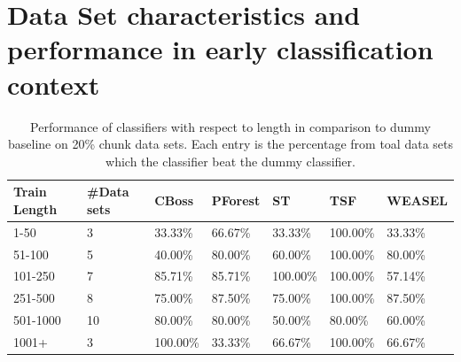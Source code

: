   \section{Data Set characteristics and performance in early classification context}
  \label{AppendixDataCharacteristis}
        \begin{table}[!ht]
            \setlength\extrarowheight{2pt} %
            \begin{tabularx}{\textwidth}{|X|X|X|X|X|X|X|}
            \hline
            \textbf{Train Length} & \textbf{\#Data sets} & \textbf{CBoss} & \textbf{PForest} & \textbf{ST} & \textbf{TSF} & \textbf{WEASEL} \\ \hline
                1-50 & 3 & 33.33\% & 66.67\% & 33.33\% & 100.00\% & 33.33\% \\ \hline
                51-100 & 5 & 40.00\% & 80.00\% & 60.00\% & 100.00\% & 80.00\% \\ \hline
                101-250 & 7 & 85.71\% & 85.71\% & 100.00\% & 100.00\% & 57.14\% \\ \hline
                251-500 & 8 & 75.00\% & 87.50\% & 75.00\% & 100.00\% & 87.50\% \\ \hline
                501-1000 & 10 & 80.00\% & 80.00\% & 50.00\% & 80.00\% & 60.00\% \\ \hline
                1001+ & 3 & 100.00\% & 33.33\% & 66.67\% & 100.00\% & 66.67\% \\ \hline
            \end{tabularx}
            \caption{Performance of classifiers with respect to length in comparison to dummy baseline on 20\% chunk data sets. Each entry is the percentage from toal data sets which the classifier beat the dummy classifier.}
        \end{table}

